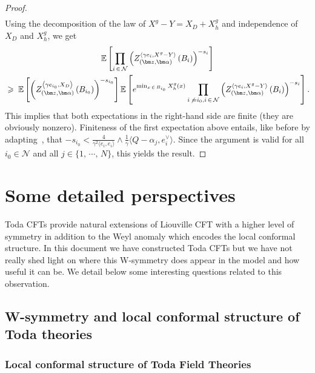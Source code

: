 \documentclass[10pt]{amsart}
\theoremstyle{definition}\newtheorem{defi}[theo]{Definition}\newtheorem{rema}[theo]{Remark}\newtheorem{exam}[theo]{Example}\newtheorem{exem}[theo]{Example}\newtheorem{nota}[theo]{Notation}
\renewcommand{\geq}{\;\geqslant\;}
\newcommand{\clN}{\mathcal{N}}
\newcommand{\E}{\mathbb{E}}
\newcommand{\ps}[1]{\langle #1 \rangle}
\begin{document}
\begin{proof}
\begin{align*}
\end{align*}
Using the decomposition of the law of $X^g-Y=X_D+X^g_h$ and independence of $X_D$ and $X^g_h$, we get
\begin{multline*}
\E \left[\prod_{i\,\in\,\clN} \left(Z_{\left(\bm z,\bm \alpha\right)}^{\left\langle\gamma e_i,X^g-Y\right\rangle} \left(B_i\right)\right)^{- s_i} \right]\\
\geq \E \left[\left(Z_{\left(\bm z,\bm \alpha\right)}^{\left\langle\gamma e_{i_0},X_D\right\rangle} \left(B_{i_0}\right)\right)^{- s_{i_0}} \right] \E \left[e^{\min_{x\,\in\, B_{i_0}}X^g_h(x)} \prod_{i\,\not\,=i_0,i\,\in\, \clN} \left(Z_{\left(\bm z,\bm \alpha\right)}^{\left\langle\gamma e_i,X^g-Y\right\rangle} \left(B_i\right)\right)^{- s_i} \right].
\end{multline*}
This implies that both expectations in the right-hand side are finite (they are obviously nonzero). Finiteness of the first expectation above entails, like before by adapting~\cite[Lemma~A.1]{DKRV}, that $-s_{i_0}<\frac{4}{\gamma^2\ps{e_i,e_i}}\wedge \frac{1}{\gamma}\langle Q-\alpha_j,e_i^\vee\rangle$. Since the argument is valid for all $i_0\in\clN$ and all $j\in\{1,\,\cdots,\,N\}$, this yields the result.
\end{proof}


\section{Some detailed perspectives}
Toda CFTs provide natural extensions of Liouville CFT with a higher level of symmetry in addition to the Weyl anomaly which encodes the local conformal structure. In this document we have constructed Toda CFTs but we have not really shed light on where this W-symmetry does appear in the model and how useful it can be. We detail below some interesting questions related to this observation.
\subsection{W-symmetry and local conformal structure of Toda theories}\label{sec:sym}
\subsubsection{Local conformal structure of Toda Field Theories}
\end{document}
